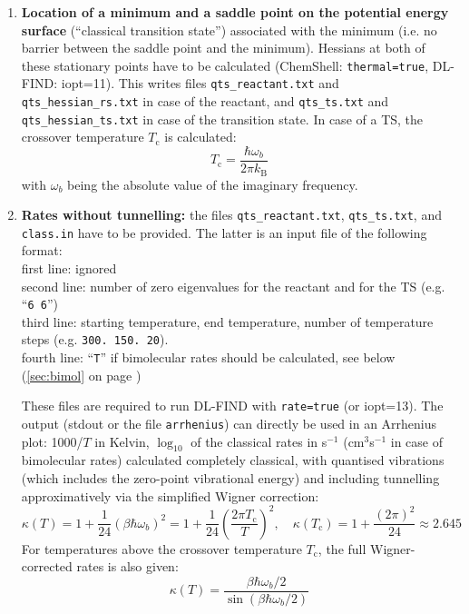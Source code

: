 \documentclass{article}
\begin{document}
\begin{enumerate}
\item \textbf{Location of a minimum and a saddle point on the potential energy surface}
  (``classical transition state'') associated with the minimum (i.e. no
  barrier between the saddle point and the minimum). Hessians at both of these
  stationary points have to be calculated (ChemShell: \texttt{thermal=true},
  DL-FIND: iopt=11). This writes files \texttt{qts\_reactant.txt} and
  \texttt{qts\_hessian\_rs.txt} in case of the reactant, and \texttt{qts\_ts.txt}
  and \texttt{qts\_hessian\_ts.txt} in case of the transition state. In case of
  a TS, the crossover temperature $T_\mathrm{c}$ is calculated:
  \begin{equation}
    T_\mathrm{c}=\frac{\hbar \omega_b}{2\pi k_\mathrm{B}}
  \end{equation}
   with $\omega_b$ being the absolute value of the imaginary
   frequency.

\item \textbf{Rates without tunnelling:} the files \texttt{qts\_reactant.txt},
  \texttt{qts\_ts.txt}, and \texttt{class.in} have to be provided. The latter is an
  input file of the following format: \\ first line: ignored\\ second line:
  number of zero eigenvalues for the reactant and for the TS
  (e.g. ``\texttt{6~6}'')\\ third line: starting temperature, end temperature,
  number of temperature steps (e.g. \texttt{300.~150.~20}).\\ fourth line:
  ``\texttt{T}'' if bimolecular rates should be calculated, see below
  (\ref{sec:bimol} on page \pageref{sec:bimol})
  
  These files are required to run DL-FIND with \texttt{rate=true} (or
  iopt=13). The output (stdout or the file \texttt{arrhenius}) can directly
  be used in an Arrhenius plot: 1000/$T$ in Kelvin, $\log_{10}$ of the
  classical rates in s$^{-1}$ (cm$^3$s$^{-1}$ in case of bimolecular rates)
  calculated completely classical, with quantised vibrations (which includes
  the zero-point vibrational energy) and including tunnelling approximatively
  via the simplified Wigner correction:
  \begin{equation}
    \kappa(T)=1+\frac{1}{24} (\beta \hbar \omega_b)^2=1+\frac{1}{24}
    \left(\frac{2\pi T_\mathrm{c}}{T}\right)^2 , \quad
    \kappa(T_\mathrm{c})=1+\frac{(2\pi)^2}{24}\approx 2.645
  \end{equation}
  For temperatures above the crossover temperature $T_\mathrm{c}$, the full
  Wigner-corrected rates is also given:
  \begin{equation}
    \kappa(T)=\frac{\beta \hbar \omega_b/2}{\sin(\beta \hbar \omega_b/2)}
  \end{equation}


\end{enumerate}
\end{document}
